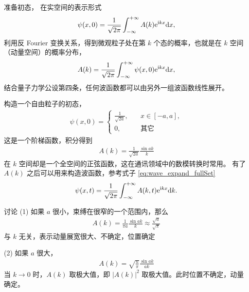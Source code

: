 

准备初态，
在实空间的表示形式
\begin{eqnarray}
    \psi(x,0) = \frac{1}{\sqrt{2\pi}} \int_{- \infty}^{+ \infty} A(k) \mathrm{e}^{\mathrm{i} kx} \mathrm{d} x, 
\end{eqnarray}
利用反 Fourier 变换关系，得到微观粒子处在第 $k$ 个态的概率，也就是在 $k$ 空间（动量空间）的概率分布，
\begin{eqnarray}
    A(k) = \frac{1}{\sqrt{2\pi}} \int_{- \infty}^{+ \infty} \psi(x,0) \mathrm{e}^{\mathrm{i} kx} \mathrm{d} x,
\end{eqnarray}
结合量子力学公设第四条，任何波函数都可以由另外一组波函数线性展开。

构造一个自由粒子的初态，
\begin{eqnarray}
    \psi(x,0) = 
    \begin{cases}
        \frac1{\sqrt{2a}},\quad &x\in[-a,a],\\
        0, \quad &\text{其它}
    \end{cases}
\end{eqnarray}
这是一个阶梯函数，积分得到
\begin{eqnarray}
    A(k) = \frac1{\sqrt{2a}} \frac{\sin ak}{k}
\end{eqnarray}
在 $k$ 空间却是一个全空间的正弦函数，这在通讯领域中的数模转换时常用。
有了 $A(k)$ 之后可以用来构造波函数，参考式子 \eqref{eq:wave_expand_fullSet}
\begin{eqnarray}
    \psi(x,t) = \frac1{\sqrt{2\pi}} \int_{- \infty}^{+ \infty} A(k,t) \mathrm{e}^{\mathrm{i} k x} \mathrm{d} k. 
\end{eqnarray}

讨论 (1) 如果 $a$ 很小，束缚在很窄的一个范围内，那么
\begin{eqnarray}
    A(k) = \frac{1}{\pi a} \frac{\sin ak}{k} \approx \frac{\sqrt{a}}{\sqrt\pi}
\end{eqnarray}
与 $k$ 无关，表示动量展宽很大、不确定，位置确定

(2) 如果 $a$ 很大，
\begin{eqnarray}
    A(k) = \sqrt{\frac{a}{\pi}} \frac{\sin ak}{ak}
\end{eqnarray}
当 $k\rightarrow 0$ 时，$A(k)$ 取极大值，即 $|A(k)|^2$ 取极大值。此时位置不确定，动量确定。

